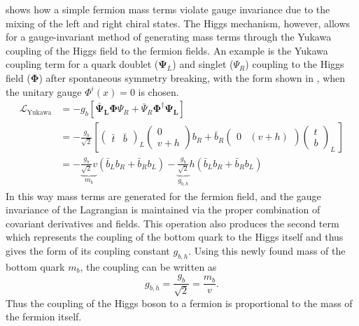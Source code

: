  shows how a simple fermion mass terms violate gauge
invariance due to the mixing of the left and right chiral states.  The Higgs
mechanism, however, allows for a gauge-invariant method of generating mass
terms through the Yukawa coupling of the Higgs field to the fermion fields.  An
example is the Yukawa coupling term for a quark doublet
($\boldsymbol{\Psi}_{L}$) and singlet ($\Psi_R$) coupling to the Higgs field
($\boldsymbol{\Phi}$) after spontaneous symmetry breaking, with the form
shown in , when the unitary gauge $\Phi^{i}(x) = 0$
is chosen.
%
\begin{align}
\mathcal{L}_{\text{Yukawa}} &= - g_{b} \left[ \boldsymbol{\bar{\Psi}_L}
\boldsymbol{\Phi} \Psi_R + \bar{\Psi}_{R} \boldsymbol{\Phi}^{\dagger} \boldsymbol{\Psi_L}
\right] \\ &= - \frac{g_{b}}{\sqrt{2}} \left[ \left( \begin{matrix}
\bar{t} & \bar{b} \end{matrix} \right)_L \left( \begin{matrix} 0 \\ v +
h \end{matrix} \right) b_{R} + \bar{b}_{R} \left( \begin{matrix} 0 & (v + h)
\end{matrix} \right) \left( \begin{matrix} t \\ b \end{matrix} \right)_L \ \right] \\ &= - \underbrace{\frac{g_{b}}{\sqrt{2}}
v}_{m_{b}} \left( \bar{b}_{L}b_{R} + \bar{b}_{R}b_{L}  \right)
- \underbrace{\frac{g_{b}}{\sqrt{2}}}_{g_{b,h}} h \left(
\bar{b}_{L}b_{R} + \bar{b}_{R}b_{L}  \right) 
\end{align}
%
In this way mass terms are generated for the fermion field, and the gauge
invariance of the Lagrangian is maintained via the proper combination of
covariant derivatives and fields.  This operation also produces the second term
which represents the coupling of the bottom quark to the Higgs itself and thus
gives the form of its coupling constant $g_{b,h}$.  Using this newly found
mass of the bottom quark $m_{b}$, the coupling can be written as
%
\begin{equation}
g_{b,h} = \frac{g_{b}}{\sqrt{2}} = \frac{m_{b}}{v}.
\end{equation}
%
Thus the coupling of the Higgs boson to a fermion is proportional
to the mass of the fermion itself. 
 
